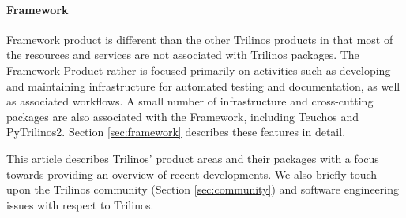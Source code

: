 \paragraph{Framework} Framework product is different than the other Trilinos products in that most of the resources and services are not associated with Trilinos packages. The Framework Product rather is focused primarily on activities such as developing and maintaining infrastructure for automated testing and documentation, as well as associated workflows. A small number of infrastructure and cross-cutting packages are also associated with the Framework, including Teuchos and PyTrilinos2. Section \ref{sec:framework} describes these features in detail.

This article describes Trilinos' product areas and their packages with a focus towards providing an overview of recent developments. We also briefly touch upon the Trilinos community (Section \ref{sec:community}) and software engineering issues with respect to Trilinos.

